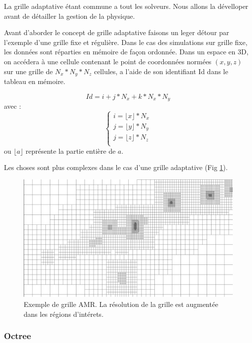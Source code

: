 La grille adaptative étant commune a tout les solveurs.
Nous allons la dévelloper avant de détailler la gestion de la physique. 

Avant d'aborder le concept de grille adaptative faisons un leger détour par l'exemple d'une grille fixe et régulière.
Dans le cas des simulations sur grille fixe, les données sont réparties en mémoire de façon ordonnée.
Dans un espace en 3D, on accédera à une cellule contenant le point de coordonnées normées $(x,y,z)$ sur une grille de $N_x*N_y*N_z$ cellules, a l'aide de son identifiant Id dans le tableau en mémoire.

\begin{equation}
Id = i + j*N_x + k * N_x*N_y
\end{equation}
avec :
\begin{equation}
\begin{cases}
i=\lfloor x \rfloor *N_x \\
j=\lfloor y \rfloor*N_y \\
j=\lfloor z \rfloor*N_z \\
\end{cases}
\end{equation}
ou $\lfloor a \rfloor$ représente la partie entière de $a$.

Les choses sont plus complexes dans le cas d'une grille adaptative (Fig \ref{fig:AMR}).

\begin{figure}[bth]
        \includegraphics[width=.95\linewidth]{img/02/AMR.pdf} 
        \caption{Exemple de grille AMR. 
        La  résolution de la grille est augmentée dans les régions d'intérets.
}
 		\label{fig:AMR}
\end{figure}


\subsubsection{Octree}

